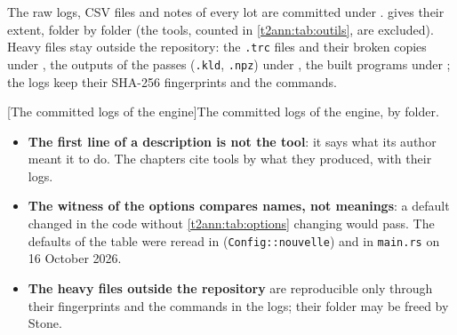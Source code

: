 The raw logs, CSV files and notes of every lot are committed under .  gives their extent, folder by folder (the tools, counted in \cref{t2ann:tab:outils}, are excluded). Heavy files stay outside the repository: the \texttt{.trc} files and their broken copies under , the outputs of the passes (\texttt{.kld}, \texttt{.npz}) under , the built programs under ; the logs keep their SHA-256 fingerprints and the commands.

\begingroup
{}[The committed logs of the engine]{The committed logs of the engine, by folder.}\label{t2ann:tab:journaux}

\endgroup

\begin{faux}
\begin{itemize}
\item \textbf{The first line of a description is not the tool}: it says what its author meant it to do. The chapters cite tools by what they produced, with their logs.
\item \textbf{The witness of the options compares names, not meanings}: a default changed in the code without \cref{t2ann:tab:options} changing would pass. The defaults of the table were reread in  (\texttt{Config::nouvelle}) and in \texttt{main.rs} on 16 October 2026.
\item \textbf{The heavy files outside the repository} are reproducible only through their fingerprints and the commands in the logs; their folder may be freed by Stone.
\end{itemize}
\end{faux}
